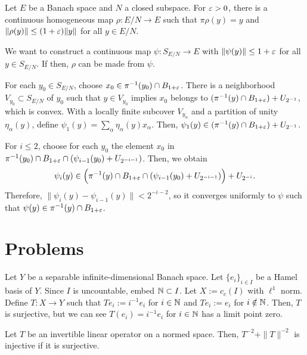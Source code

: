 \documentclass{../../large}
\begin{document}
\begin{prb}
Let $E$ be a Banach space and $N$ a closed subspace.
For $\varepsilon>0$, there is a continuous homogeneous map $\rho:E/N\to E$ such that $\pi\rho(y)=y$ and $\|\rho(y)\|\le(1+\varepsilon)\|y\|$ for all $y\in E/N$.
\end{prb}
\begin{pf}
We want to construct a continuous map $\psi:S_{E/N}\to E$ with $\|\psi(y)\|\le1+\varepsilon$ for all $y\in S_{E/N}$.
If then, $\rho$ can be made from $\psi$.

For each $y_0\in S_{E/N}$, choose $x_0\in\pi^{-1}(y_0)\cap B_{1+\varepsilon}$.
There is a neighborhood $V_{y_0}\subset S_{E/N}$ of $y_0$ such that $y\in V_{y_0}$ implies $x_0$ belongs to $(\pi^{-1}(y)\cap B_{1+\varepsilon})+U_{2^{-1}}$, which is convex.
With a locally finite subcover $V_{y_\alpha}$ and a partition of unity $\eta_\alpha(y)$, define $\psi_1(y)=\sum_\alpha\eta_\alpha(y)x_\alpha$.
Then, $\psi_1(y)\in(\pi^{-1}(y)\cap B_{1+\varepsilon})+U_{2^{-1}}$.

For $i\le2$, choose for each $y_0$ the element $x_0$ in $\pi^{-1}(y_0)\cap B_{1+\varepsilon}\cap(\psi_{i-1}(y_0)+U_{2^{-{i-1}}})$.
Then, we obtain
\[\psi_i(y)\in\Bigl(\pi^{-1}(y)\cap B_{1+\varepsilon}\cap(\psi_{i-1}(y_0)+U_{2^{-{i-1}}})\Bigr)+U_{2^{-i}}.\]
Therefore, $\|\psi_i(y)-\psi_{i-1}(y)\|<2^{-{i-2}}$, so it converges uniformly to $\psi$ such that $\psi(y)\in\pi^{-1}(y)\cap B_{1+\varepsilon}$.
\end{pf}

\section*{Problems}


Let $Y$ be a separable infinite-dimensional Banach space.
Let $\{e_i\}_{i\in I}$ be a Hamel basis of $Y$.
Since $I$ is uncountable, embed $\mathbb{N}\subset I$.
Let $X:=c_c(I)$ with $\ell^1$ norm.
Define $T:X\to Y$ such that $Te_i:=i^{-1}e_i$ for $i\in\mathbb{N}$ and $Te_i:=e_i$ for $i\notin\mathbb{N}$.
Then, $T$ is surjective, but we can see $T(e_i)=i^{-1}e_i$ for $i\in\mathbb{N}$ has a limit point zero.

\begin{prb}
Let $T$ be an invertible linear operator on a normed space.
Then, $T^{-2}+\|T\|^{-2}$ is injective if it is surjective.
\end{prb}
\end{document}
